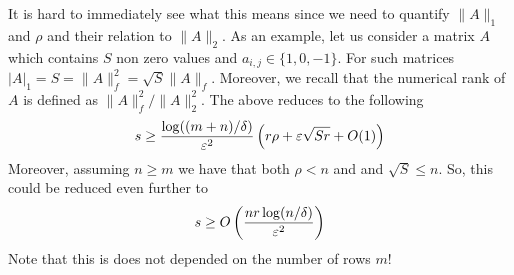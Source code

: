 It is hard to immediately see what this means since we need to quantify $\|A\|_1$ and $\rho$ and their relation to $\|A\|_2$.
As an example, let us consider a matrix $A$ which contains $S$ non zero values and $a_{i,j} \in \{1,0,-1\}$.
For such matrices $|A|_1 = S = \|A\|_f^2  =\sqrt{S}\|A\|_f$. Moreover,  we recall that the numerical rank of $A$ is defined as $\|A\|_f^2/\|A\|_2^2$.
The above reduces to the following
\[
s \ge \frac{\log((m+n)/\delta)}{\varepsilon^2}\left(r\rho +\varepsilon\sqrt{Sr}+ O(1)\right)
\]
Moreover, assuming $n \ge m$ we have that both $\rho < n$ and  and $\sqrt{S} \le n$. So, this could be reduced even further to  
\[
s \ge O\left(\frac{nr \log(n/\delta)}{\varepsilon^2}\right)
\]
Note that this is does not depended on the number of rows $m$!



















